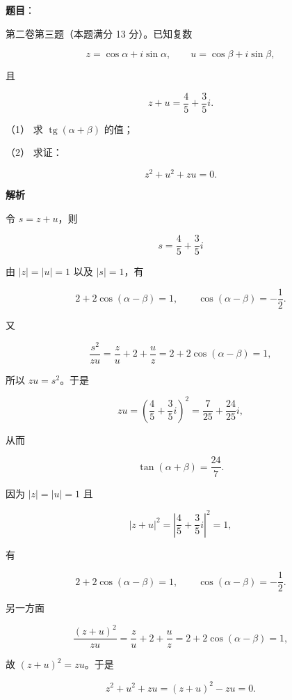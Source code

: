 \begin{answer}

\textbf{题目}：

第二卷第三题（本题满分 13 分）。已知复数

\nopagebreak[4]
\[
z=\cos\alpha+i\sin\alpha,\qquad
u=\cos\beta+i\sin\beta,
\]

且

\nopagebreak[4]
\[
z+u=\frac45+\frac35i.
\]

（1） 求 $\operatorname{tg}(\alpha+\beta)$ 的值；

（2） 求证：

\nopagebreak[4]
\[
z^2+u^2+zu=0.
\]

\textbf{解析}


令 $s=z+u$，则

\nopagebreak[4]
\[
s=\frac45+\frac35i
\]

由 $|z|=|u|=1$ 以及 $|s|=1$，有

\nopagebreak[4]
\[
2+2\cos(\alpha-\beta)=1,
\qquad
\cos(\alpha-\beta)=-\frac12.
\]

又

\nopagebreak[4]
\[
\frac{s^2}{zu}
=\frac zu+2+\frac uz
=2+2\cos(\alpha-\beta)=1,
\]

所以 $zu=s^2$。于是

\nopagebreak[4]
\[
zu=\left(\frac45+\frac35i\right)^2
=\frac7{25}+\frac{24}{25}i,
\]

从而

\nopagebreak[4]
\[
\tan(\alpha+\beta)=\frac{24}{7}.
\]


因为 $|z|=|u|=1$ 且

\nopagebreak[4]
\[
\left|z+u\right|^2
=\left|\frac45+\frac35i\right|^2=1,
\]

有

\nopagebreak[4]
\[
2+2\cos(\alpha-\beta)=1,
\qquad
\cos(\alpha-\beta)=-\frac12.
\]

另一方面

\nopagebreak[4]
\[
\frac{(z+u)^2}{zu}
=\frac zu+2+\frac uz
=2+2\cos(\alpha-\beta)=1,
\]

故 $(z+u)^2=zu$。于是

\nopagebreak[4]
\[
z^2+u^2+zu=(z+u)^2-zu=0.
\]



\end{answer}
